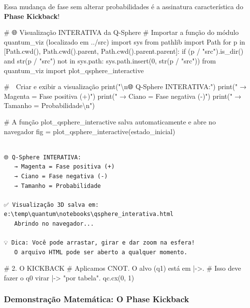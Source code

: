 \documentclass[
  brazilian,
]{report}
\newenvironment{Shaded}{\begin{snugshade}}{\end{snugshade}}
\newcommand{\NormalTok}[1]{\textcolor[rgb]{0.00,0.23,0.31}{#1}}
\begin{document}
Essa mudança de fase sem alterar probabilidades é a assinatura
característica do \textbf{Phase Kickback}!

\begin{Shaded}
\begin{Highlighting}[]

\NormalTok{\# 🌐 Visualização INTERATIVA da Q{-}Sphere}
\NormalTok{\# Importar a função do módulo quantum\_viz (localizado em ../src)}
\NormalTok{import sys}
\NormalTok{from pathlib import Path}
\NormalTok{for p in [Path.cwd(), Path.cwd().parent, Path.cwd().parent.parent]:}
\NormalTok{    if (p / "src").is\_dir() and str(p / "src") not in sys.path:}
\NormalTok{        sys.path.insert(0, str(p / "src"))}
\NormalTok{from quantum\_viz import plot\_qsphere\_interactive}

\NormalTok{\# 🎨 Criar e exibir a visualização}
\NormalTok{print("\textbackslash{}n🌐 Q{-}Sphere INTERATIVA:")}
\NormalTok{print("   → Magenta = Fase positiva (+)")}
\NormalTok{print("   → Ciano = Fase negativa ({-})")}
\NormalTok{print("   → Tamanho = Probabilidade\textbackslash{}n")}

\NormalTok{\# A função plot\_qsphere\_interactive salva automaticamente e abre no navegador}
\NormalTok{fig = plot\_qsphere\_interactive(estado\_inicial)}
\end{Highlighting}
\end{Shaded}

\begin{verbatim}

🌐 Q-Sphere INTERATIVA:
   → Magenta = Fase positiva (+)
   → Ciano = Fase negativa (-)
   → Tamanho = Probabilidade

✅ Visualização 3D salva em: e:\temp\quantum\notebooks\qsphere_interativa.html
   Abrindo no navegador...

💡 Dica: Você pode arrastar, girar e dar zoom na esfera!
   O arquivo HTML pode ser aberto a qualquer momento.
\end{verbatim}

\begin{Shaded}
\begin{Highlighting}[]


\NormalTok{\# 2. O KICKBACK}
\NormalTok{\# Aplicamos CNOT. O alvo (q1) está em |{-}\textgreater{}.}
\NormalTok{\# Isso deve fazer o q0 virar |{-}\textgreater{} "por tabela".}
\NormalTok{qc.cx(0, 1)}
\end{Highlighting}
\end{Shaded}

\subsubsection{Demonstração Matemática: O Phase
Kickback}\label{demonstrauxe7uxe3o-matemuxe1tica-o-phase-kickback}
\end{document}
